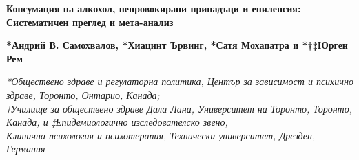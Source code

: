 \documentclass{article}
\begin{document}
\setlength{\headheight}{23.10004pt}
\begin{center}
\end{center}

\begin{center}
  \textbf{\LARGE Консумация на алкохол, непровокирани припадъци и епилепсия:}\\
  \textbf{\LARGE Систематичен преглед и мета-анализ}
\end{center}

\begin{center}
  \textbf{*Андрий В. Самохвалов, *Хиацинт Ървинг, *Сатя Мохапатра и *†‡Юрген Рем}
\end{center}

\begin{center}
  \textit{*Обществено здраве и регулаторна политика, Център за зависимост и психично здраве, Торонто, Онтарио, Канада;}\\
  \textit{†Училище за обществено здраве Дала Лана, Университет на Торонто, Торонто, Канада; и ‡Епидемиологично изследователско звено,}\\
  \textit{Клинична психология и психотерапия, Технически университет, Дрезден, Германия}
\end{center}

\end{document}
